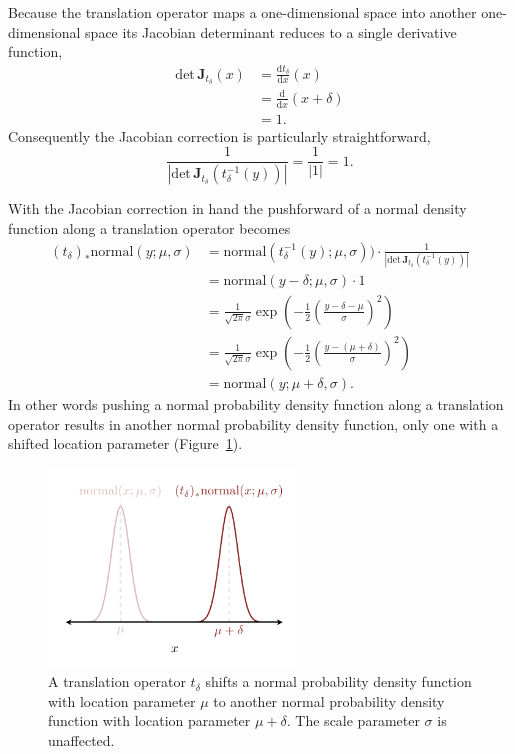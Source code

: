 \documentclass[
  letterpaper,
  DIV=11,
  numbers=noendperiod]{scrartcl}
\begin{document}
Because the translation operator maps a one-dimensional space into
another one-dimensional space its Jacobian determinant reduces to a
single derivative function, \begin{align*}
\mathrm{det} \,  \mathbf{J}_{t_{\delta}}(x)
&= \frac{ \mathrm{d} t_{\delta} }{ \mathrm{d} x }(x)
\\
&= \frac{ \mathrm{d} }{ \mathrm{d} x } ( x + \delta )
\\
&= 1.
\end{align*} Consequently the Jacobian correction is particularly
straightforward, \[
\frac{1}
{| \mathrm{det} \, \mathbf{J}_{t_{\delta}}(t_{\delta}^{-1}(y)) |}
=
\frac{1}{ | 1 | }
=
1.
\]

With the Jacobian correction in hand the pushforward of a normal density
function along a translation operator becomes \begin{align*}
(t_{\delta})_{*} \mathrm{normal}(y; \mu, \sigma)
&=
\mathrm{normal}(t_{\delta}^{-1}(y); \mu, \sigma))
\cdot
\frac{1}
{| \mathrm{det} \,  \mathbf{J}_{t_{\delta}}(t_{\delta}^{-1}(y)) |}
\\
&=
\mathrm{normal}(y - \delta; \mu, \sigma) \cdot 1
\\
&= \frac{1}{\sqrt{2 \pi} \sigma}
\exp \left(
-\frac{1}{2} \left( \frac{ y - \delta - \mu}{\sigma} \right)^{2} \right)
\\
&= \frac{1}{\sqrt{2 \pi} \sigma}
\exp \left(
-\frac{1}{2} \left( \frac{ y - (\mu + \delta)}{\sigma} \right)^{2}
\right)
\\
&=
\mathrm{normal}(y; \mu + \delta, \sigma).
\end{align*} In other words pushing a normal probability density
function along a translation operator results in another normal
probability density function, only one with a shifted location parameter
(Figure~\ref{fig-translation}).

\begin{figure}

{\centering \includegraphics[width=0.6\textwidth,height=\textheight]{figures/pushforwards_density_functions/translation/translation.pdf}

}

\caption{\label{fig-translation}A translation operator \(t_{\delta}\)
shifts a normal probability density function with location parameter
\(\mu\) to another normal probability density function with location
parameter \(\mu + \delta\). The scale parameter \(\sigma\) is
unaffected.}

\end{figure}
\end{document}
